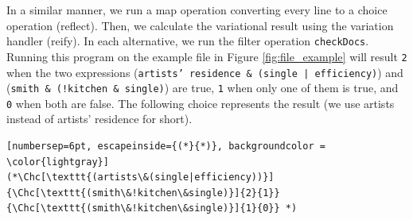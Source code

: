 In a similar manner, we run a map operation converting every line to a choice operation (reflect). Then, we calculate the variational result using the variation handler (reify). In each alternative, we run the filter operation \texttt{checkDocs}. Running this program on the example file in Figure \ref{fig:file_example} will result \texttt{2} when the two expressions (\texttt{artists' residence \& (single | efficiency)}) and (\texttt{smith \& (!kitchen \& single)}) are true, \texttt{1} when only one of them is true, and \texttt{0} when both are false. The following choice represents the result (we use artists instead of artists' residence for short).
%
\begin{lstlisting}[numbersep=6pt, escapeinside={(*}{*)}, backgroundcolor = \color{lightgray}]
(*\Chc[\texttt{(artists\&(single|efficiency))}]{\Chc[\texttt{(smith\&!kitchen\&single)}]{2}{1}}{\Chc[\texttt{(smith\&!kitchen\&single)}]{1}{0}} *)
\end{lstlisting}









